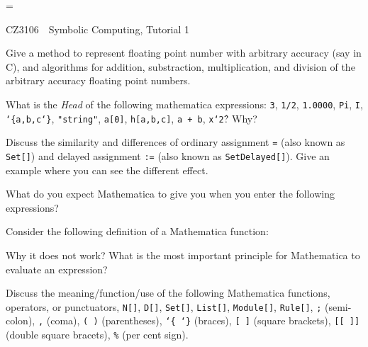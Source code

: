 \magnification=\magstephalf

\nopagenumbers

\centerline{\titlefont CZ3106\ \  Symbolic Computing, Tutorial 1}
\bigskip
\bigskip
{}
\bigskip
\bigskip
\bigskip


\problem Give a method to represent floating point number with
arbitrary accuracy (say in C), and algorithms for addition, 
substraction, multiplication, and division of the arbitrary accuracy
floating point numbers.

\problem  What is the {\sl Head} of the following mathematica expressions:
{\tt 3}, {\tt 1/2}, {\tt 1.0000}, {\tt Pi}, {\tt I}, 
{\tt \char`\{a,b,c\char`\}},
{\tt "string"}, {\tt a[0]}, {\tt h[a,b,c]}, {\tt a + b}, {\tt x\char`\^2}?
Why?

\problem Discuss the similarity and differences of ordinary assignment
{\tt =} (also known as {\tt Set[]}) and delayed assignment {\tt :=}
(also known as {\tt SetDelayed[]}).  Give an example where you can
see the different effect.

\problem  What do you expect Mathematica to give you when you enter the
following expressions?
\smallskip
{}
\medskip

\problem Consider the following definition of a Mathematica function:\par
{}
\item{} Why it does not work?  What is the most important principle for 
Mathematica to evaluate an expression?

\problem  Discuss the meaning/function/use of the following 
Mathematica functions, operators, or punctuators,
{\tt N[]}, {\tt D[]}, {\tt Set[]}, {\tt List[]}, {\tt Module[]},
{\tt Rule[]}, {\tt ;} (semi-colon), {\tt ,} (coma), 
{\tt ( )} (parentheses), {\tt \char`\{ \char`\}} (braces),
{\tt [ ]} (square brackets), {\tt [[ ]]} (double square bracets),
{\tt \%} (per cent sign).  

